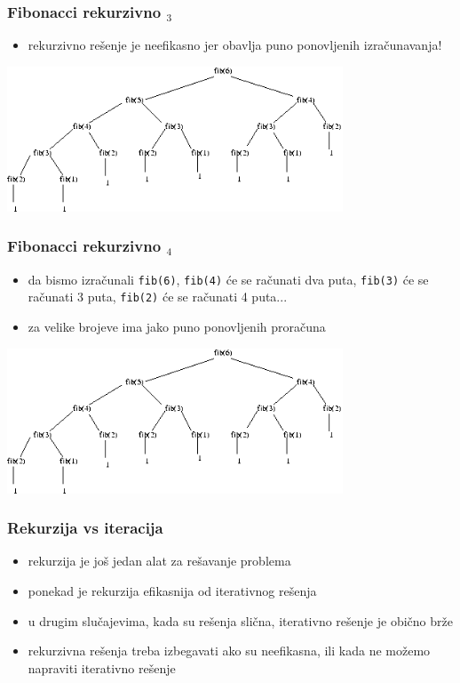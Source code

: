 \documentclass[utf8,compress]{beamer}
\begin{document}
\begin{frame}[fragile]
  \frametitle{Fibonacci rekurzivno $_3$}
  \begin{itemize}
    \item rekurzivno rešenje je neefikasno jer obavlja puno ponovljenih izračunavanja!
  \end{itemize}
\begin{center}
  \includegraphics[width=10cm]{pic27}
\end{center}
\end{frame}

\begin{frame}[fragile]
  \frametitle{Fibonacci rekurzivno $_4$}
  \begin{itemize}
    \item da bismo izračunali \texttt{fib(6)}, \texttt{fib(4)} će se računati dva puta, 
      \texttt{fib(3)} će se računati 3 puta, \texttt{fib(2)} će se računati 4 puta...
    \item za velike brojeve ima jako puno ponovljenih proračuna
  \end{itemize}
\begin{center}
  \includegraphics[width=10cm]{pic27}
\end{center}
\end{frame}

\begin{frame}[fragile]
  \frametitle{Rekurzija vs iteracija}
  \begin{itemize}
    \item rekurzija je još jedan alat za rešavanje problema
    \item ponekad je rekurzija efikasnija od iterativnog rešenja
    \item u drugim slučajevima, kada su rešenja slična, iterativno rešenje je obično brže
    \item rekurzivna rešenja treba izbegavati ako su neefikasna, ili kada ne možemo napraviti iterativno rešenje
  \end{itemize}
\end{frame}
\end{document}
